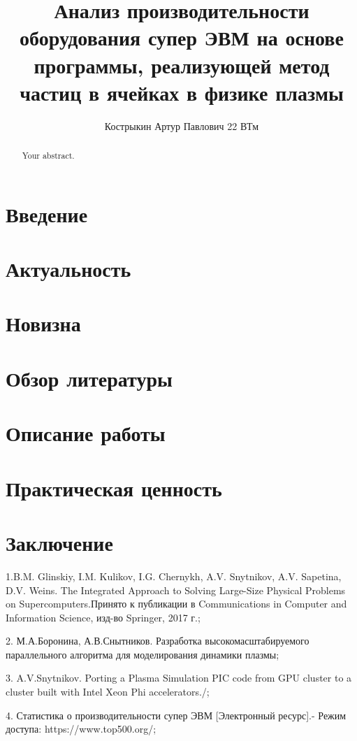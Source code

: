 \documentclass{article}
\title{Анализ производительности оборудования супер ЭВМ на основе программы, реализующей метод частиц в ячейках в физике плазмы}
\author{Кострыкин Артур Павлович 22 ВТм}
\begin{document}
\maketitle

\begin{abstract}
Your abstract.
\end{abstract}

\section{Введение}
\section{Актуальность}
\section{Новизна}
\section{Обзор литературы}

\section{Описание работы}
\section{Практическая ценность}
\section{Заключение}






1.B.M. Glinskiy, I.M. Kulikov, I.G. Chernykh, A.V. Snytnikov, A.V. Sapetina, D.V. Weins.  The Integrated Approach to Solving Large-Size Physical Problems on Supercomputers.Принято к публикации в Communications in Computer and Information Science, изд-во Springer, 2017 г.;

2. М.А.Боронина, А.В.Снытников. Разработка высокомасштабируемого параллельного алгоритма для моделирования динамики плазмы;

3. A.V.Snytnikov.  Porting a Plasma Simulation PIC code from GPU cluster to a cluster built with Intel Xeon Phi accelerators./;

4. Статистика о производительности  супер ЭВМ [Электронный ресурс].- Режим доступа: https://www.top500.org/;
\end{document}
